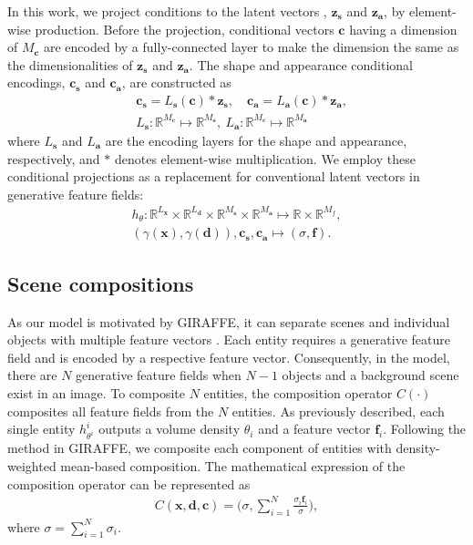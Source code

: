 \documentclass[nohyperref]{article}
\theoremstyle{plain}
\theoremstyle{definition}
\theoremstyle{remark}
\begin{document}
In this work, we project conditions to the latent vectors \cite{cgan_proj}, $\textbf{z}_{\textbf{s}}$ and $\textbf{z}_{\textbf{a}}$, by element-wise production. Before the projection, conditional vectors $\textbf{c}$ having a dimension of $M_{\textbf{c}}$ are encoded by a fully-connected layer to make the dimension the same as the dimensionalities of $\textbf{z}_\textbf{s}$ and $\textbf{z}_\textbf{a}$. The shape and appearance conditional encodings, $\textbf{c}_{\textbf{s}}$ and $\textbf{c}_{\textbf{a}}$, are constructed as
\begin{align}
    &\textbf{c}_{\textbf{s}} = L_{\textbf{s}}(\textbf{c}) * \textbf{z}_{\textbf{s}}, \quad \textbf{c}_{\textbf{a}} = L_{\textbf{a}}(\textbf{c}) * \textbf{z}_{\textbf{a}},
    \\ \nonumber
    &L_{\textbf{s}}: \mathbb{R}^{M_{\textbf{c}}} \mapsto \mathbb{R}^{M_{\textbf{s}}}, \
    L_{\textbf{a}}: \mathbb{R}^{M_{\textbf{c}}} \mapsto \mathbb{R}^{M_{\textbf{a}}}
\end{align}
where $L_{\textbf{s}}$ and $L_{\textbf{a}}$ are the encoding layers for the shape and appearance, respectively, and $*$ denotes element-wise multiplication. We employ these conditional projections as a replacement for conventional latent vectors in generative feature fields:
\begin{align}
    h_{\theta}: \mathbb{R}^{L_\textbf{x}} \times \mathbb{R}^{L_\textbf{d}} \times \mathbb{R}^{M_\textbf{s}} \times \mathbb{R}^{M_\textbf{a}} \mapsto \mathbb{R} \times \mathbb{R}^{M_{f}},
    \\ \nonumber (\gamma(\textbf{x}), \gamma(\textbf{d})), \textbf{c}_{\textbf{s}}, \textbf{c}_\textbf{a} \mapsto (\sigma, \textbf{f}).
\end{align}






\subsection{Scene compositions}
As our model is motivated by GIRAFFE, it can separate scenes and individual objects with multiple feature vectors \cite{niemeyer2021giraffe}. Each entity requires a generative feature field and is encoded by a respective feature vector. Consequently, in the model, there are $N$ generative feature fields when $N - 1$ objects and a background scene exist in an image. To composite $N$ entities, the composition operator $C\left(\cdot\right)$ composites all feature fields from the $N$ entities. As previously described, each single entity $h_{\theta^{i}}^{i}$ outputs a volume density $\theta_{i}$ and a feature vector $\textbf{f}_{i}$. Following the method in GIRAFFE, we composite each component of entities with density-weighted mean-based composition. The mathematical expression of the composition operator can be represented as
\begin{align}
    C(\textbf{x}, \textbf{d}, \textbf{c}) = \Big(\sigma, \sum_{i=1}^{N}\frac{\sigma_{i}\textbf{f}_{i}}{\sigma}\Big),
\end{align}
where $\sigma = \sum_{i=1}^{N}\sigma_{i}$.
\end{document}
